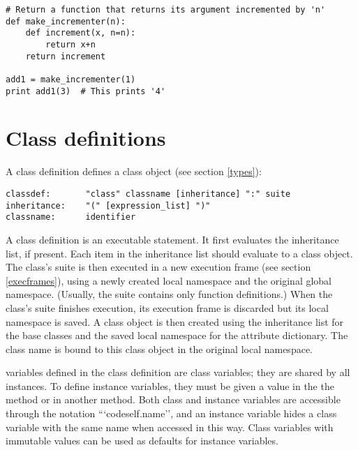 \begin{verbatim}
# Return a function that returns its argument incremented by 'n'
def make_incrementer(n):
    def increment(x, n=n):
        return x+n
    return increment

add1 = make_incrementer(1)
print add1(3)  # This prints '4'
\end{verbatim}

\section{Class definitions\label{class}}

A class definition defines a class object (see section \ref{types}):

\begin{verbatim}
classdef:       "class" classname [inheritance] ":" suite
inheritance:    "(" [expression_list] ")"
classname:      identifier
\end{verbatim}

A class definition is an executable statement.  It first evaluates the
inheritance list, if present.  Each item in the inheritance list
should evaluate to a class object.  The class's suite is then executed
in a new execution frame (see section \ref{execframes}), using a newly
created local namespace and the original global namespace.
(Usually, the suite contains only function definitions.)  When the
class's suite finishes execution, its execution frame is discarded but
its local namespace is saved.  A class object is then created using
the inheritance list for the base classes and the saved local
namespace for the attribute dictionary.  The class name is bound to this
class object in the original local namespace.

 variables defined in the class definition
are class variables; they are shared by all instances.  To define
instance variables, they must be given a value in the the
 method or in another method.  Both class and
instance variables are accessible through the notation
```code{self.name}'', and an instance variable hides a class variable
with the same name when accessed in this way.  Class variables with
immutable values can be used as defaults for instance variables.
